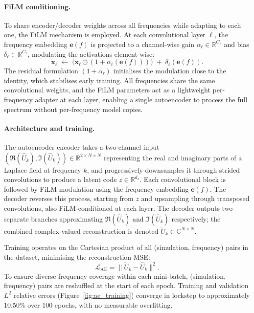 \documentclass[a4paper]{article}
\newcommand{\R}{\mathbb{R}}
\newcommand{\C}{\mathbb{C}}
\begin{document}
\paragraph{FiLM conditioning.}
To share encoder/decoder weights across all frequencies while adapting to each one, the FiLM mechanism \cite{perez2018film} is employed. At each convolutional layer $\ell$, the frequency embedding $\bm{e}(f)$ is projected to a channel-wise gain $\alpha_\ell \in \R^{C_\ell}$ and bias $\delta_\ell \in \R^{C_\ell}$, modulating the activations element-wise:
\begin{equation}
    \bm{x}_\ell \;\leftarrow\; \bigl(\bm{x}_\ell \odot (1 + \alpha_\ell(\bm{e}(f)))\bigr) \;+\; \delta_\ell(\bm{e}(f)).
    \label{eq:film}
\end{equation}
The residual formulation $(1 + \alpha_\ell)$ initialises the modulation close to the identity, which stabilises early training. All frequencies share the same convolutional weights, and the FiLM parameters act as a lightweight per-frequency adapter at each layer, enabling a single autoencoder to process the full spectrum without per-frequency model copies.

\paragraph{Architecture and training.}
The autoencoder encoder takes a two-channel input $(\Re(\hat{U}_k), \Im(\hat{U}_k)) \in \R^{2 \times N \times N}$ representing the real and imaginary parts of a Laplace field at frequency $k$, and progressively downsamples it through strided convolutions to produce a latent code $z \in \R^{d_z}$. Each convolutional block is followed by FiLM modulation using the frequency embedding $\bm{e}(f)$. The decoder reverses this process, starting from $z$ and upsampling through transposed convolutions, also FiLM-conditioned at each layer. The decoder outputs two separate branches approximating $\Re(\hat{U}_k)$ and $\Im(\hat{U}_k)$ respectively; the combined complex-valued reconstruction is denoted $\tilde{U}_k \in \C^{N \times N}$.

Training operates on the Cartesian product of all (simulation, frequency) pairs in the dataset, minimising the reconstruction MSE:
\begin{equation}
    \mathcal{L}_{\mathrm{AE}} = \|\tilde{U}_k - \hat{U}_k\|^2.
    \label{eq:aeloss}
\end{equation}
To ensure diverse frequency coverage within each mini-batch, (simulation, frequency) pairs are reshuffled at the start of each epoch. Training and validation $L^2$ relative errors (Figure~\ref{fig:ae_training}) converge in lockstep to approximately 10.50\% over 100 epochs, with no measurable overfitting.
\end{document}
